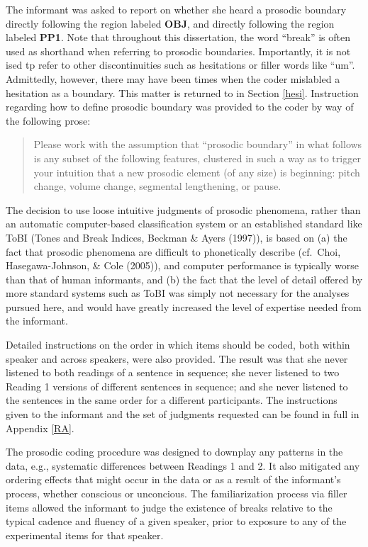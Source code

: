 \documentclass[11pt,oneside]{book}
\begin{document}
The informant was asked to report on whether she heard a prosodic boundary directly following the region labeled \textbf{OBJ}, and directly following the region labeled \textbf{PP1}. Note that throughout this dissertation, the word ``break'' is often used as shorthand when referring to prosodic boundaries. Importantly, it is not ised tp refer to other discontinuities such as hesitations or filler words like ``um''. Admittedly, however, there may have been times when the coder mislabled a hesitation as a boundary. This matter is returned to in Section \ref{hesi}. Instruction regarding how to define prosodic boundary was provided to the coder by way of the following prose:

\begin{quote}
Please work with the assumption that ``prosodic boundary'' in what follows is any subset of the following features, clustered in such a way as to trigger your intuition that a new prosodic element (of any size) is beginning: pitch change, volume change, segmental lengthening, or pause.
\end{quote}

The decision to use loose intuitive judgments of prosodic phenomena, rather than an automatic computer-based classification system or an established standard like ToBI (Tones and Break Indices, Beckman \& Ayers (1997)), is based on (a) the fact that prosodic phenomena are difficult to phonetically describe (cf.~Choi, Hasegawa-Johnson, \& Cole (2005)), and computer performance is typically worse than that of human informants, and (b) the fact that the level of detail offered by more standard systems such as ToBI was simply not necessary for the analyses pursued here, and would have greatly increased the level of expertise needed from the informant.

Detailed instructions on the order in which items should be coded, both within speaker and across speakers, were also provided. The result was that she never listened to both readings of a sentence in sequence; she never listened to two Reading 1 versions of different sentences in sequence; and she never listened to the sentences in the same order for a different participants. The instructions given to the informant and the set of judgments requested can be found in full in Appendix \ref{RA}.

The prosodic coding procedure was designed to downplay any patterns in the data, e.g., systematic differences between Readings 1 and 2. It also mitigated any ordering effects that might occur in the data or as a result of the informant's process, whether conscious or unconcious. The familiarization process via filler items allowed the informant to judge the existence of breaks relative to the typical cadence and fluency of a given speaker, prior to exposure to any of the experimental items for that speaker.
\end{document}
